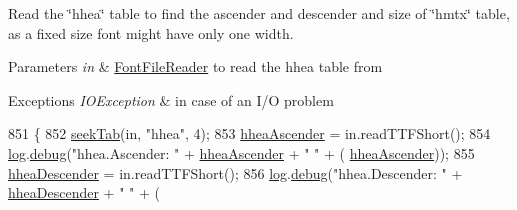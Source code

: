 Read the \char`\"{}hhea\char`\"{} table to find the ascender and descender and size of \char`\"{}hmtx\char`\"{} table, as a fixed size font might have only one width. 
\begin{DoxyParams}{Parameters}
{\em in} & \mbox{\hyperlink{classorg_1_1newdawn_1_1slick_1_1tools_1_1hiero_1_1truetype_1_1_font_file_reader}{Font\+File\+Reader}} to read the hhea table from \\
\hline
\end{DoxyParams}

\begin{DoxyExceptions}{Exceptions}
{\em I\+O\+Exception} & in case of an I/O problem \\
\hline
\end{DoxyExceptions}

\begin{DoxyCode}
851                                \{
852         \mbox{\hyperlink{classorg_1_1newdawn_1_1slick_1_1tools_1_1hiero_1_1truetype_1_1_t_t_f_file_abccbd8b00bcebc8015fa41fef0239cf4}{seekTab}}(in, \textcolor{stringliteral}{"hhea"}, 4);
853         \mbox{\hyperlink{classorg_1_1newdawn_1_1slick_1_1tools_1_1hiero_1_1truetype_1_1_t_t_f_file_a4b818891b347701a7f2775474b4a0a5f}{hheaAscender}} = in.readTTFShort(); 
854         \mbox{\hyperlink{classorg_1_1newdawn_1_1slick_1_1tools_1_1hiero_1_1truetype_1_1_t_t_f_file_ae6acbd4aea68fd8cf15305aa535993f4}{log}}.\mbox{\hyperlink{classorg_1_1newdawn_1_1slick_1_1tools_1_1hiero_1_1truetype_1_1_log_a067b2d2d3d00472e36456a266302dc5b}{debug}}(\textcolor{stringliteral}{"hhea.Ascender: "} + \mbox{\hyperlink{classorg_1_1newdawn_1_1slick_1_1tools_1_1hiero_1_1truetype_1_1_t_t_f_file_a4b818891b347701a7f2775474b4a0a5f}{hheaAscender}} + \textcolor{stringliteral}{" "} + (
      \mbox{\hyperlink{classorg_1_1newdawn_1_1slick_1_1tools_1_1hiero_1_1truetype_1_1_t_t_f_file_a4b818891b347701a7f2775474b4a0a5f}{hheaAscender}}));
855         \mbox{\hyperlink{classorg_1_1newdawn_1_1slick_1_1tools_1_1hiero_1_1truetype_1_1_t_t_f_file_a95ad6b8f70bf2a5df8cc07d443b338ef}{hheaDescender}} = in.readTTFShort();
856         \mbox{\hyperlink{classorg_1_1newdawn_1_1slick_1_1tools_1_1hiero_1_1truetype_1_1_t_t_f_file_ae6acbd4aea68fd8cf15305aa535993f4}{log}}.\mbox{\hyperlink{classorg_1_1newdawn_1_1slick_1_1tools_1_1hiero_1_1truetype_1_1_log_a067b2d2d3d00472e36456a266302dc5b}{debug}}(\textcolor{stringliteral}{"hhea.Descender: "} + \mbox{\hyperlink{classorg_1_1newdawn_1_1slick_1_1tools_1_1hiero_1_1truetype_1_1_t_t_f_file_a95ad6b8f70bf2a5df8cc07d443b338ef}{hheaDescender}} + \textcolor{stringliteral}{" "} + (

\end{DoxyCode}
